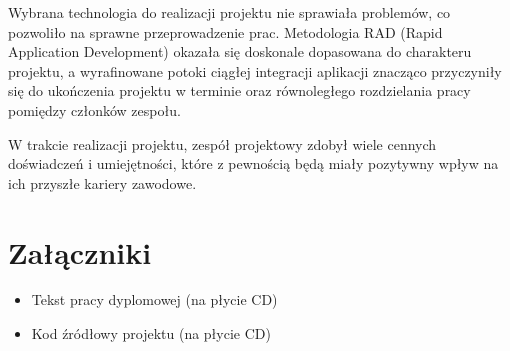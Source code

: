 Wybrana technologia do realizacji projektu nie sprawiała problemów, co pozwoliło na sprawne przeprowadzenie prac.
Metodologia RAD (Rapid Application Development) okazała się doskonale dopasowana do charakteru projektu, a wyrafinowane potoki ciągłej integracji aplikacji znacząco przyczyniły się do ukończenia projektu w terminie oraz równoległego rozdzielania pracy pomiędzy członków zespołu.

W trakcie realizacji projektu, zespół projektowy zdobył wiele cennych doświadczeń i umiejętności, które z pewnością będą miały pozytywny wpływ na ich przyszłe kariery zawodowe.

\chapter*{Załączniki}
\begin{itemize}
    \item Tekst pracy dyplomowej (na płycie CD)
    \item Kod źródłowy projektu (na płycie CD)
\end{itemize}

